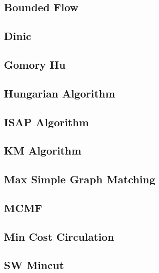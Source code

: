 \documentclass[twocolumn]{article}
\begin{document}
\subsection{Bounded Flow}


\subsection{Dinic}


\subsection{Gomory Hu}


\subsection{Hungarian Algorithm}


\subsection{ISAP Algorithm}


\subsection{KM Algorithm}


\subsection{Max Simple Graph Matching}


\subsection{MCMF}


\subsection{Min Cost Circulation}


\subsection{SW Mincut}

\end{document}
